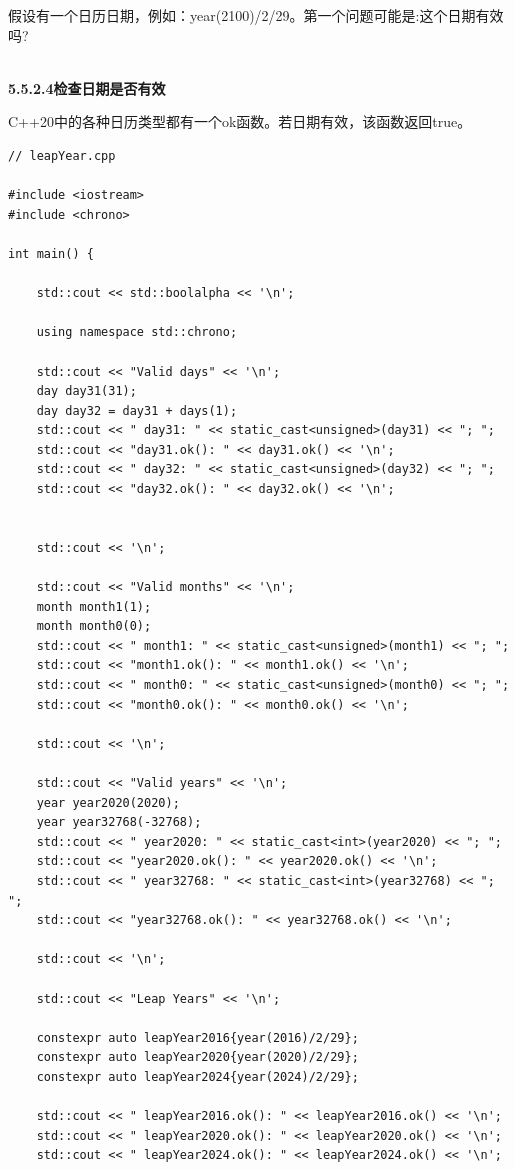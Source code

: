 假设有一个日历日期，例如：year(2100)/2/29。第一个问题可能是:这个日期有效吗?

\hspace*{\fill} \\ %
\noindent
\textbf{5.5.2.4\hspace{0.2cm}检查日期是否有效}

C++20中的各种日历类型都有一个ok函数。若日期有效，该函数返回true。

\begin{lstlisting}[style=styleCXX]
// leapYear.cpp

#include <iostream>
#include <chrono>

int main() {
	
	std::cout << std::boolalpha << '\n';
	
	using namespace std::chrono;
	
	std::cout << "Valid days" << '\n';
	day day31(31);
	day day32 = day31 + days(1);
	std::cout << " day31: " << static_cast<unsigned>(day31) << "; ";
	std::cout << "day31.ok(): " << day31.ok() << '\n';
	std::cout << " day32: " << static_cast<unsigned>(day32) << "; ";
	std::cout << "day32.ok(): " << day32.ok() << '\n';
	
	
	std::cout << '\n';
	
	std::cout << "Valid months" << '\n';
	month month1(1);
	month month0(0);
	std::cout << " month1: " << static_cast<unsigned>(month1) << "; ";
	std::cout << "month1.ok(): " << month1.ok() << '\n';
	std::cout << " month0: " << static_cast<unsigned>(month0) << "; ";
	std::cout << "month0.ok(): " << month0.ok() << '\n';
	
	std::cout << '\n';
	
	std::cout << "Valid years" << '\n';
	year year2020(2020);
	year year32768(-32768);
	std::cout << " year2020: " << static_cast<int>(year2020) << "; ";
	std::cout << "year2020.ok(): " << year2020.ok() << '\n';
	std::cout << " year32768: " << static_cast<int>(year32768) << "; ";
	std::cout << "year32768.ok(): " << year32768.ok() << '\n';
	
	std::cout << '\n';
	
	std::cout << "Leap Years" << '\n';
	
	constexpr auto leapYear2016{year(2016)/2/29};
	constexpr auto leapYear2020{year(2020)/2/29};
	constexpr auto leapYear2024{year(2024)/2/29};
	
	std::cout << " leapYear2016.ok(): " << leapYear2016.ok() << '\n';
	std::cout << " leapYear2020.ok(): " << leapYear2020.ok() << '\n';
	std::cout << " leapYear2024.ok(): " << leapYear2024.ok() << '\n';
	

\end{lstlisting}
